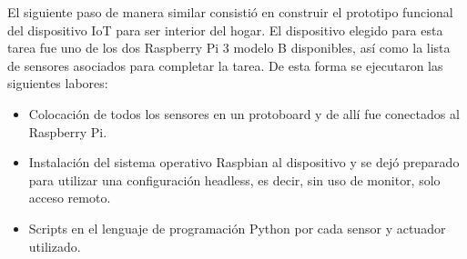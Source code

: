 El siguiente paso de manera similar consistió en construir el prototipo funcional del dispositivo IoT para ser interior del hogar. El dispositivo elegido para esta tarea fue uno de los dos Raspberry Pi 3 modelo B disponibles, así como la lista de sensores asociados para completar la tarea. De esta forma se ejecutaron las siguientes labores:
\begin{itemize}
\item Colocación de todos los sensores en un protoboard y de allí fue conectados al Raspberry Pi.

\item Instalación del sistema operativo Raspbian al dispositivo y se dejó preparado para utilizar una configuración headless, es decir, sin uso de monitor, solo acceso remoto.

\item Scripts en el lenguaje de programación Python por cada sensor y actuador utilizado. 


\end{itemize}
